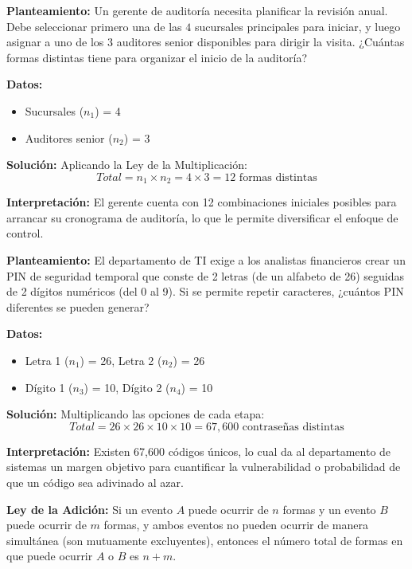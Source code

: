 \documentclass[12pt,letterpaper]{book}
\newcounter{ejemplo}[chapter]
\begin{document}
\begin{ejemplo}
    \textbf{Planteamiento:} Un gerente de auditoría necesita planificar la revisión anual. Debe seleccionar primero una de las $4$ sucursales principales para iniciar, y luego asignar a uno de los $3$ auditores senior disponibles para dirigir la visita. ¿Cuántas formas distintas tiene para organizar el inicio de la auditoría?
    
    \textbf{Datos:}
    \begin{itemize}
        \item Sucursales ($n_{1}$) = 4
        \item Auditores senior ($n_{2}$) = 3
    \end{itemize}
    
    \textbf{Solución:}
    Aplicando la Ley de la Multiplicación:
    \[ Total = n_{1} \times n_{2} = 4 \times 3 = 12 \text{ formas distintas} \]
    
    \textbf{Interpretación:} El gerente cuenta con 12 combinaciones iniciales posibles para arrancar su cronograma de auditoría, lo que le permite diversificar el enfoque de control.
\end{ejemplo}

\begin{ejemplo}
    \textbf{Planteamiento:} El departamento de TI exige a los analistas financieros crear un PIN de seguridad temporal que conste de 2 letras (de un alfabeto de 26) seguidas de 2 dígitos numéricos (del 0 al 9). Si se permite repetir caracteres, ¿cuántos PIN diferentes se pueden generar?
    
    \textbf{Datos:}
    \begin{itemize}
        \item Letra 1 ($n_{1}$) = 26, Letra 2 ($n_{2}$) = 26
        \item Dígito 1 ($n_{3}$) = 10, Dígito 2 ($n_{4}$) = 10
    \end{itemize}
    
    \textbf{Solución:}
    Multiplicando las opciones de cada etapa:
    \[ Total = 26 \times 26 \times 10 \times 10 = 67,600 \text{ contraseñas distintas} \]
    
    \textbf{Interpretación:} Existen 67,600 códigos únicos, lo cual da al departamento de sistemas un margen objetivo para cuantificar la vulnerabilidad o probabilidad de que un código sea adivinado al azar.
\end{ejemplo}

\begin{definicion}
    \textbf{Ley de la Adición:} Si un evento $A$ puede ocurrir de $n$ formas y un evento $B$ puede ocurrir de $m$ formas, y ambos eventos no pueden ocurrir de manera simultánea (son mutuamente excluyentes), entonces el número total de formas en que puede ocurrir $A$ o $B$ es $n + m$.
\end{definicion}
\end{document}
